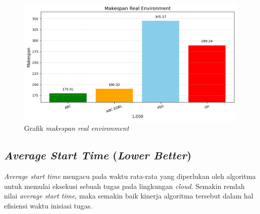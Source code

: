 \newpage

\begin{figure} [H]
    \centering
    \includegraphics[width=0.75\linewidth]{gambar/Grafik Makespan Real Environment.png}
    \caption{Grafik \textit{makespan real environment}}
\end{figure}

\subsection{\textit{Average Start Time} (\textit{Lower Better})}
\textit{Average start time} mengacu pada waktu rata-rata yang diperlukan oleh algoritma untuk memulai eksekusi sebuah tugas pada lingkungan \textit{cloud}. Semakin rendah nilai \textit{average start time}, maka semakin baik kinerja algoritma tersebut dalam hal efisiensi waktu inisiasi tugas.

